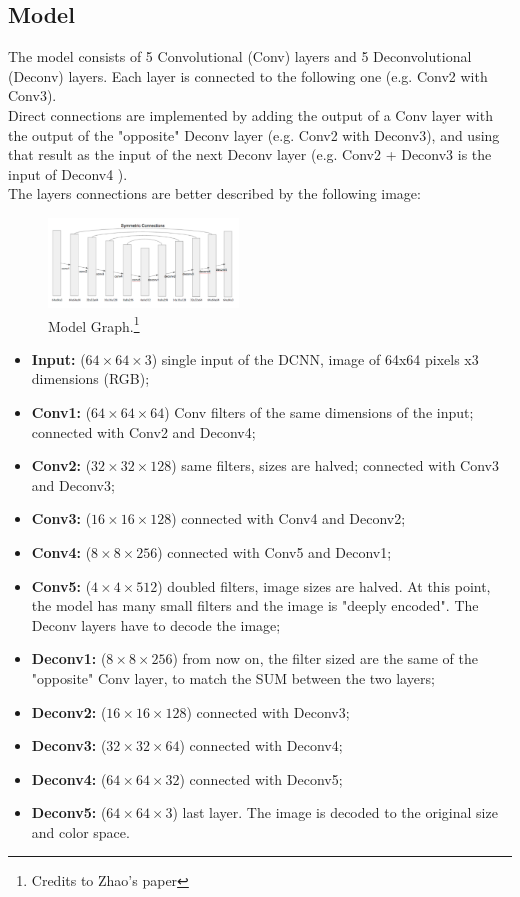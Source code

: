 \documentclass[twocolumn,showpacs,%
  nofootinbib,aps,superscriptaddress,%
  eqsecnum,prd,notitlepage,showkeys,10pt]{revtex4-1}
\begin{document}
\subsection{Model}
The model consists of 5 Convolutional (Conv) layers and 5 Deconvolutional (Deconv) layers. Each layer is connected to the following one (e.g. Conv2 with Conv3).\\
Direct connections are implemented by adding the output of a Conv layer with the output of the "opposite" Deconv layer (e.g. Conv2 with Deconv3), and using that result as the input of the next Deconv layer (e.g. Conv2 + Deconv3 is the input of Deconv4 ).\\
The layers connections are better described by the following image: 
\begin{figure}[H]
    \includegraphics[width=0.45\textwidth]{images/modelgraph.PNG}
    \caption{\label{fig:noise}Model Graph.\footnote{Credits to Zhao's paper}}
\end{figure}
\begin{itemize}
    \item \textbf{Input:} ($64\times64\times3$) single input of the DCNN, image of 64x64 pixels x3 dimensions (RGB);
    \item \textbf{Conv1:} ($64\times64\times64$) Conv filters of the same dimensions of the input; connected with Conv2 and Deconv4;
    \item \textbf{Conv2:} ($32\times32\times128$) same filters, sizes are halved; connected with Conv3 and Deconv3;
    \item \textbf{Conv3:} ($16\times16\times128$) connected with Conv4 and Deconv2;
    \item \textbf{Conv4:} ($8\times8\times256$) connected with Conv5 and Deconv1;
    \item \textbf{Conv5:} ($4\times4\times512$) doubled filters, image sizes are halved. At this point, the model has many small filters and the image is "deeply encoded". The Deconv layers have to decode the image;
    \item \textbf{Deconv1:} ($8\times8\times256$) from now on, the filter sized are the same of the "opposite" Conv layer, to match the SUM between the two layers;
    \item \textbf{Deconv2:} ($16\times16\times128$) connected with Deconv3;
    \item \textbf{Deconv3:} ($32\times32\times64$) connected with Deconv4;
    \item \textbf{Deconv4:} ($64\times64\times32$) connected with Deconv5;
    \item \textbf{Deconv5:} ($64\times64\times3$) last layer. The image is decoded to the original size and color space.
\end{itemize}
\end{document}
